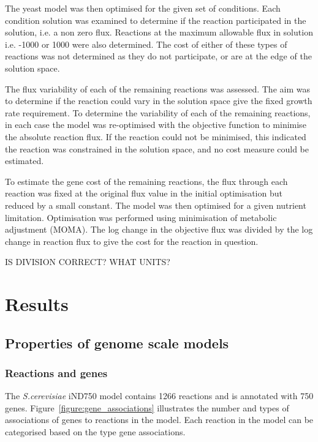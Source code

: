 The yeast model was then optimised for the given set of conditions. Each condition solution was examined to determine if the reaction participated in the solution, i.e. a non zero flux. Reactions at the maximum allowable flux in solution i.e. -1000 or 1000 were also determined. The cost of either of these types of reactions was not determined as they do not participate, or are at the edge of the solution space.

The flux variability of each of the remaining reactions was assessed. The aim was to determine if the reaction could vary in the solution space give the fixed growth rate requirement. To determine the variability of each of the remaining reactions, in each case the model was re-optimised with the objective function to minimise the absolute reaction flux. If the reaction could not be minimised, this indicated the reaction was constrained in the solution space, and no cost measure could be estimated.

To estimate the gene cost of the remaining reactions, the flux through each reaction was fixed at the original flux value in the initial optimisation but reduced by a small constant. The model was then optimised for a given nutrient limitation. Optimisation was performed using minimisation of metabolic adjustment (MOMA). The log change in the objective flux was divided by the log change in reaction flux to give the cost for the reaction in question.

IS DIVISION CORRECT?
WHAT UNITS?

\clearpage

\section{Results}

\subsection{Properties of genome scale models}

\subsubsection{Reactions and genes}

The \emph{S.cerevisiae} iND750 model contains 1266 reactions and is annotated with 750 genes. Figure~\vref{figure:gene_associations} illustrates the number and types of associations of genes to reactions in the model. Each reaction in the model can be categorised based on the type gene associations.

